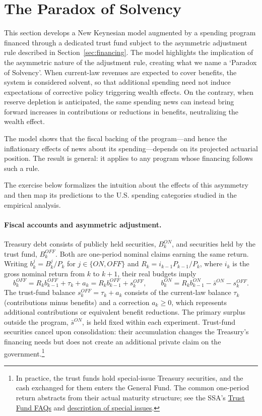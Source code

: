 \documentclass[12pt]{article}%
\theoremstyle{remark}
\begin{document}
\section{The Paradox of Solvency}\label{sec:model}

This section develops a New Keynesian model augmented by  a spending program financed through a dedicated trust fund subject to the asymmetric adjustment rule described in Section~\ref{sec:financing}. The model highlights the implication of the asymmetric nature of the adjustment rule, creating what we name  a `Paradox of Solvency'.
When current-law revenues are expected to cover benefits, the system is considered solvent, so that additional spending need not induce expectations of corrective policy triggering wealth effects. On the contrary, when reserve depletion is anticipated, the same spending news can instead bring forward increases in contributions or reductions in benefits, neutralizing the wealth effect.


The model shows that the fiscal backing of the program---and hence the inflationary effects of news about its spending---depends on its projected actuarial position. The result is general: it applies to any program whose financing follows such a rule. 

The exercise below formalizes the intuition about the effects of this asymmetry and
then map its predictions to the U.S. spending categories studied in the empirical analysis.

\paragraph{Fiscal accounts and asymmetric adjustment.}
Treasury debt consists of publicly held securities, $B^{ON}_k$, and securities held by the trust fund, $B^{OFF}_k$. Both are one-period nominal claims earning the same return. Writing $b^j_k = B^j_k/P_k$ for $j\in\{ON,OFF\}$ and $R_k = i_{k-1}P_{k-1}/P_k$, where $i_k$ is the gross nominal return from $k$ to $k+1$, their real budgets imply
\begin{equation}\label{eq:budgets}
b^{OFF}_k = R_k b^{OFF}_{k-1} + \tau_k + a_k = R_k b^{OFF}_{k-1} + s^{OFF}_k,
\qquad
b^{ON}_k = R_k b^{ON}_{k-1} - \bar s^{ON} - s^{OFF}_k .
\end{equation}
The trust-fund balance $s^{OFF}_k=\tau_k+a_k$ consists of the current-law balance
$\tau_k$ (contributions minus benefits) and a correction $a_k\geq 0$, which
represents additional contributions or equivalent benefit reductions. The primary
surplus outside the program, $\bar s^{ON}$, is held fixed within each experiment.
Trust-fund securities cancel upon consolidation: their accumulation changes the
Treasury's financing needs but does not create an additional private claim on the
government.\footnote{In practice, the trust funds hold special-issue Treasury
securities, and the cash exchanged for them enters the General Fund. The common one-period return abstracts from their actual maturity structure; see the SSA's \href{https://www.ssa.gov/oact/progdata/fundFAQ.html}{Trust Fund FAQs} and \href{https://www.ssa.gov/OACT/ProgData/specialissues.html}{description of special issues}.}
\end{document}
